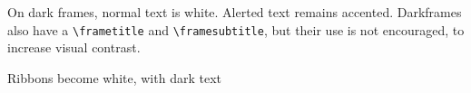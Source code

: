 \documentclass[10pt,aspectratio=169]{beamer}
\begin{document}
\begin{darkframe}

    On dark frames, normal text is white. \alert{Alerted text} remains accented. Darkframes also have a \texttt{\textbackslash{}frametitle} and \texttt{\textbackslash{}framesubtitle}, but their use is not encouraged, to increase visual contrast.

    \vfill
    \begin{ribbon}%
        Ribbons become white, with dark text
    \end{ribbon}
\end{darkframe}

\blackslide
\end{document}
